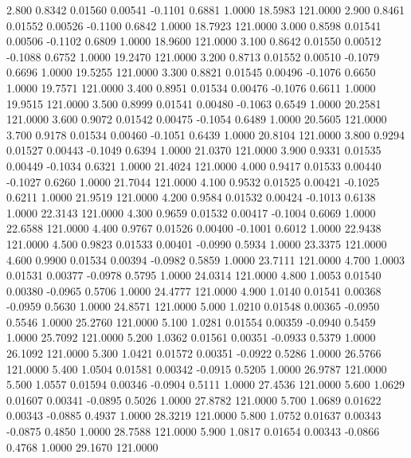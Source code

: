    2.800   0.8342   0.01560   0.00541  -0.1101   0.6881   1.0000  18.5983 121.0000
   2.900   0.8461   0.01552   0.00526  -0.1100   0.6842   1.0000  18.7923 121.0000
   3.000   0.8598   0.01541   0.00506  -0.1102   0.6809   1.0000  18.9600 121.0000
   3.100   0.8642   0.01550   0.00512  -0.1088   0.6752   1.0000  19.2470 121.0000
   3.200   0.8713   0.01552   0.00510  -0.1079   0.6696   1.0000  19.5255 121.0000
   3.300   0.8821   0.01545   0.00496  -0.1076   0.6650   1.0000  19.7571 121.0000
   3.400   0.8951   0.01534   0.00476  -0.1076   0.6611   1.0000  19.9515 121.0000
   3.500   0.8999   0.01541   0.00480  -0.1063   0.6549   1.0000  20.2581 121.0000
   3.600   0.9072   0.01542   0.00475  -0.1054   0.6489   1.0000  20.5605 121.0000
   3.700   0.9178   0.01534   0.00460  -0.1051   0.6439   1.0000  20.8104 121.0000
   3.800   0.9294   0.01527   0.00443  -0.1049   0.6394   1.0000  21.0370 121.0000
   3.900   0.9331   0.01535   0.00449  -0.1034   0.6321   1.0000  21.4024 121.0000
   4.000   0.9417   0.01533   0.00440  -0.1027   0.6260   1.0000  21.7044 121.0000
   4.100   0.9532   0.01525   0.00421  -0.1025   0.6211   1.0000  21.9519 121.0000
   4.200   0.9584   0.01532   0.00424  -0.1013   0.6138   1.0000  22.3143 121.0000
   4.300   0.9659   0.01532   0.00417  -0.1004   0.6069   1.0000  22.6588 121.0000
   4.400   0.9767   0.01526   0.00400  -0.1001   0.6012   1.0000  22.9438 121.0000
   4.500   0.9823   0.01533   0.00401  -0.0990   0.5934   1.0000  23.3375 121.0000
   4.600   0.9900   0.01534   0.00394  -0.0982   0.5859   1.0000  23.7111 121.0000
   4.700   1.0003   0.01531   0.00377  -0.0978   0.5795   1.0000  24.0314 121.0000
   4.800   1.0053   0.01540   0.00380  -0.0965   0.5706   1.0000  24.4777 121.0000
   4.900   1.0140   0.01541   0.00368  -0.0959   0.5630   1.0000  24.8571 121.0000
   5.000   1.0210   0.01548   0.00365  -0.0950   0.5546   1.0000  25.2760 121.0000
   5.100   1.0281   0.01554   0.00359  -0.0940   0.5459   1.0000  25.7092 121.0000
   5.200   1.0362   0.01561   0.00351  -0.0933   0.5379   1.0000  26.1092 121.0000
   5.300   1.0421   0.01572   0.00351  -0.0922   0.5286   1.0000  26.5766 121.0000
   5.400   1.0504   0.01581   0.00342  -0.0915   0.5205   1.0000  26.9787 121.0000
   5.500   1.0557   0.01594   0.00346  -0.0904   0.5111   1.0000  27.4536 121.0000
   5.600   1.0629   0.01607   0.00341  -0.0895   0.5026   1.0000  27.8782 121.0000
   5.700   1.0689   0.01622   0.00343  -0.0885   0.4937   1.0000  28.3219 121.0000
   5.800   1.0752   0.01637   0.00343  -0.0875   0.4850   1.0000  28.7588 121.0000
   5.900   1.0817   0.01654   0.00343  -0.0866   0.4768   1.0000  29.1670 121.0000
